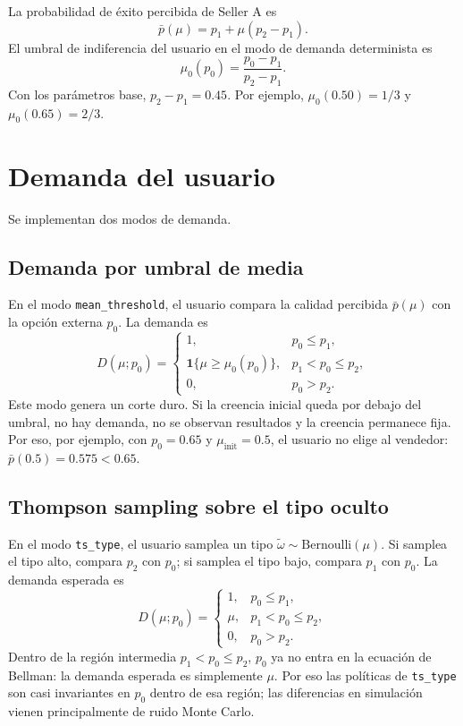 \documentclass[11pt]{article}
\begin{document}
La probabilidad de éxito percibida de Seller A es
\[
\bar p(\mu)=p_1+\mu(p_2-p_1).
\]
El umbral de indiferencia del usuario en el modo de demanda determinista es
\[
\mu_0(p_0)=\frac{p_0-p_1}{p_2-p_1}.
\]
Con los parámetros base, \(p_2-p_1=0.45\). Por ejemplo,
\(\mu_0(0.50)=1/3\) y \(\mu_0(0.65)=2/3\).

\section{Demanda del usuario}

Se implementan dos modos de demanda.

\subsection{Demanda por umbral de media}

En el modo \texttt{mean\_threshold}, el usuario compara la calidad percibida
\(\bar p(\mu)\) con la opción externa \(p_0\). La demanda es
\[
D(\mu;p_0)=
\begin{cases}
1, & p_0\le p_1,\\
\mathbf{1}\{\mu\ge \mu_0(p_0)\}, & p_1<p_0\le p_2,\\
0, & p_0>p_2.
\end{cases}
\]
Este modo genera un corte duro. Si la creencia inicial queda por debajo del
umbral, no hay demanda, no se observan resultados y la creencia permanece fija.
Por eso, por ejemplo, con \(p_0=0.65\) y \(\mu_{\mathrm{init}}=0.5\), el usuario
no elige al vendedor: \(\bar p(0.5)=0.575<0.65\).

\subsection{Thompson sampling sobre el tipo oculto}

En el modo \texttt{ts\_type}, el usuario samplea un tipo
\(\tilde \omega\sim\mathrm{Bernoulli}(\mu)\). Si samplea el tipo alto, compara
\(p_2\) con \(p_0\); si samplea el tipo bajo, compara \(p_1\) con \(p_0\). La
demanda esperada es
\[
D(\mu;p_0)=
\begin{cases}
1, & p_0\le p_1,\\
\mu, & p_1<p_0\le p_2,\\
0, & p_0>p_2.
\end{cases}
\]
Dentro de la región intermedia \(p_1<p_0\le p_2\), \(p_0\) ya no entra en la
ecuación de Bellman: la demanda esperada es simplemente \(\mu\). Por eso las
políticas de \texttt{ts\_type} son casi invariantes en \(p_0\) dentro de esa
región; las diferencias en simulación vienen principalmente de ruido Monte
Carlo.
\end{document}
